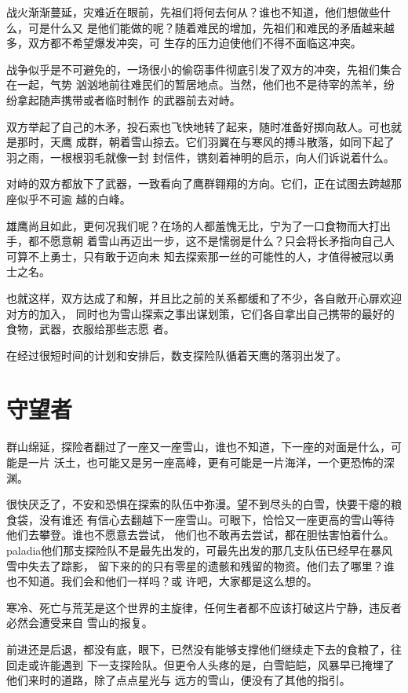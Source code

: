 \documentclass[UTF8]{ctexbook}
\begin{document}
战火渐渐蔓延，灾难近在眼前，先祖们将何去何从？谁也不知道，他们想做些什么，可是什么又
是他们能做的呢？随着难民的增加，先祖们和难民的矛盾越来越多，双方都不希望爆发冲突，可
生存的压力迫使他们不得不面临这冲突。

战争似乎是不可避免的，一场很小的偷窃事件彻底引发了双方的冲突，先祖们集合在一起，气势
汹汹地前往难民们的暂居地点。当然，他们也不是待宰的羔羊，纷纷拿起随声携带或者临时制作
的武器前去对峙。

双方举起了自己的木矛，投石索也飞快地转了起来，随时准备好掷向敌人。可也就是那时，天鹰
成群，朝着雪山掠去。它们羽翼在与寒风的搏斗散落，如同下起了羽之雨，一根根羽毛就像一封
封信件，镌刻着神明的启示，向人们诉说着什么。

对峙的双方都放下了武器，一致看向了鹰群翱翔的方向。它们，正在试图去跨越那座似乎不可逾
越的白峰。

雄鹰尚且如此，更何况我们呢？在场的人都羞愧无比，宁为了一口食物而大打出手，都不愿意朝
着雪山再迈出一步，这不是懦弱是什么？只会将长矛指向自己人可算不上勇士，只有敢于迈向未
知去探索那一丝的可能性的人，才值得被冠以勇士之名。

也就这样，双方达成了和解，并且比之前的关系都缓和了不少，各自敞开心扉欢迎对方的加入，
同时也为雪山探索之事出谋划策，它们各自拿出自己携带的最好的食物，武器，衣服给那些志愿
者。

在经过很短时间的计划和安排后，数支探险队循着天鹰的落羽出发了。

    \chapter{守望者}
    群山绵延，探险者翻过了一座又一座雪山，谁也不知道，下一座的对面是什么，可能是一片
    沃土，也可能又是另一座高峰，更有可能是一片海洋，一个更恐怖的深渊。

很快厌乏了，不安和恐惧在探索的队伍中弥漫。望不到尽头的白雪，快要干瘪的粮食袋，没有谁还
有信心去翻越下一座雪山。可眼下，恰恰又一座更高的雪山等待他们去攀登。谁也不愿意去尝试，
他们也不敢再去尝试，都在胆怯害怕着什么。
paladia他们那支探险队不是最先出发的，可最先出发的那几支队伍已经早在暴风雪中失去了踪影，
留下来的的只有零星的遗骸和残留的物资。他们去了哪里？谁也不知道。我们会和他们一样吗？或
许吧，大家都是这么想的。

寒冷、死亡与荒芜是这个世界的主旋律，任何生者都不应该打破这片宁静，违反者必然会遭受来自
雪山的报复。

前进还是后退，都没有底，眼下，已然没有能够支撑他们继续走下去的食粮了，往回走或许能遇到
下一支探险队。但更令人头疼的是，白雪皑皑，风暴早已掩埋了他们来时的道路，除了点点星光与
远方的雪山，便没有了其他的指引。
\end{document}
